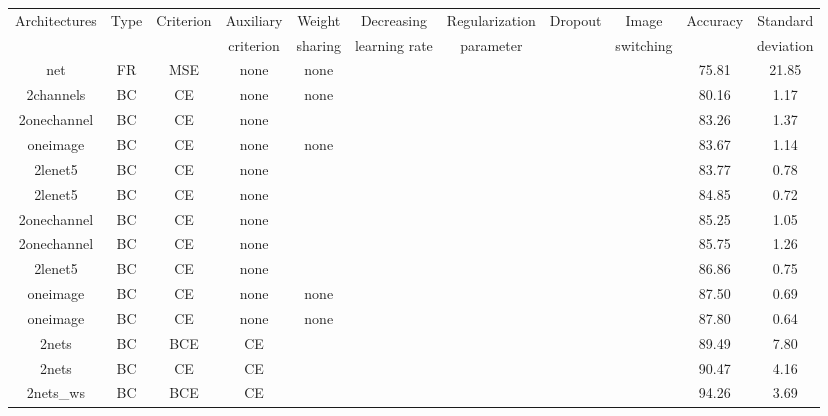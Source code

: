 \documentclass[10pt,conference,compsocconf]{IEEEtran}
\newcommand{\xmark}{\ding{55}}
\begin{document}
\begin{table}[H]
\begin{tabular}{|c 	|c		|c  			|c 					|c 				|c  				|c 				|c 			|c				|c 			|c|}
  \hline
	Architectures 	& Type	& Criterion 	& Auxiliary 			& Weight			& Decreasing 		& Regularization 	& Dropout 	& Image			& Accuracy 	& Standard \\
				&		&			& criterion			& sharing			& learning rate	& parameter		&			& switching		&			& deviation \\
  \hline
	net	 		& FR		& MSE 		& none 				& none 			& \checkmark	 	& \xmark 		& \xmark		& \checkmark		& 75.81 		& 21.85 \\ %
	2channels	& BC 	& CE 		& none 				& none			& \xmark			& \xmark			& \xmark		& \xmark			& 80.16		& 1.17 \\
	2onechannel	& BC	& CE 		& none 				& \checkmark		& \xmark			& \xmark			& \xmark		& \xmark			& 83.26		& 1.37 \\
	oneimage	& BC	& CE 		& none 				& none			& \xmark			& \xmark			& \xmark		& \xmark			& 83.67		& 1.14 \\
	2lenet5		& BC	& CE 		& none 				& \xmark			& \xmark			& \xmark			& \xmark		& \xmark			& 83.77		& 0.78 \\
	2lenet5		& BC	& CE 		& none 				& \xmark			& \xmark			& \xmark			& \checkmark	& \xmark			& 84.85		& 0.72 \\
	2onechannel	& BC	& CE 		& none 				& \checkmark		& \xmark			& \xmark			& \checkmark	& \xmark			& 85.25		& 1.05 \\
	2onechannel	& BC	& CE 		& none 				& \checkmark		& \xmark			& \xmark			& \checkmark	& \checkmark		& 85.75		& 1.26 \\
	2lenet5		& BC	& CE 		& none 				& \xmark			& \xmark			& \xmark			& \checkmark	& \checkmark		& 86.86		& 0.75 \\
	oneimage	& BC	& CE 		& none 				& none			& \xmark			& \xmark			& \checkmark	& \xmark			& 87.50		& 0.69 \\
	oneimage	& BC	& CE 		& none 				& none			& \xmark			& \xmark			& \checkmark	& \checkmark		& 87.80		& 0.64 \\
	2nets 		& BC 	& BCE 		& CE 				& \xmark 		& \xmark 		& \xmark 		& \xmark 	& \xmark			& 89.49 		& 7.80 \\
	2nets 		& BC 	& CE 		& CE 				& \xmark 		& \xmark 		& \xmark 		& \xmark 	& \xmark			& 90.47 		& 4.16 \\
	2nets\_ws	& BC 	& BCE 		& CE 				& \checkmark		& \xmark			& \xmark 		& \xmark		& \xmark			& 94.26		& 3.69 \\

\end{tabular}
\end{table}
\end{document}
